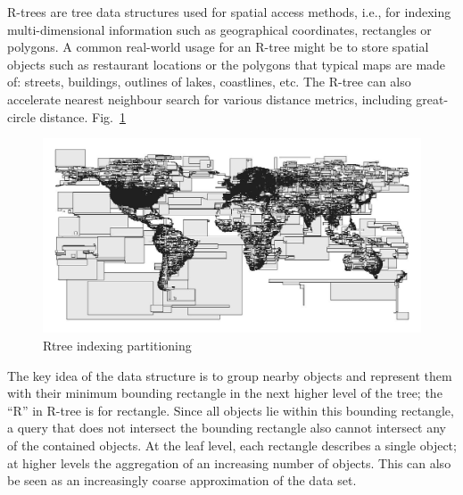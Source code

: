  R-trees are tree data structures used for spatial access methods, i.e., for indexing multi-dimensional information such as geographical coordinates, rectangles or polygons. A common real-world usage for an R-tree might be to store spatial objects such as restaurant locations or the polygons that typical maps are made of: streets, buildings, outlines of lakes, coastlines, etc. The R-tree can also accelerate nearest neighbour search for various distance metrics, including great-circle distance. Fig.~\ref{fig:rtree}
 
 \begin{figure}[htb!]
\centering
\includegraphics[width=0.90\columnwidth]{figures/Rtree.png}
\caption{Rtree indexing partitioning}
\label{fig:rtree}
\end{figure}

The key idea of the data structure is to group nearby objects and represent them with their minimum bounding rectangle in the next higher level of the tree; the ``R'' in R-tree is for rectangle. Since all objects lie within this bounding rectangle, a query that does not intersect the bounding rectangle also cannot intersect any of the contained objects. At the leaf level, each rectangle describes a single object; at higher levels the aggregation of an increasing number of objects. This can also be seen as an increasingly coarse approximation of the data set.
